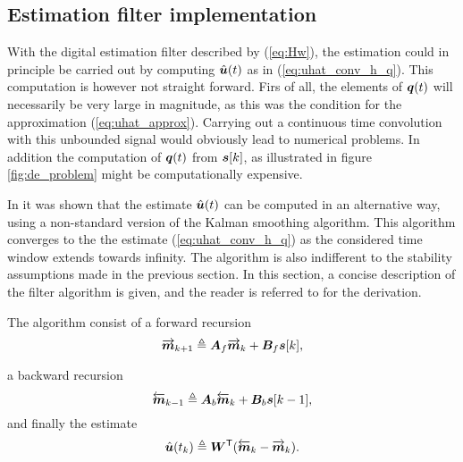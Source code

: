 \subsection{Estimation filter implementation}
With the digital estimation filter described by (\ref{eq:Hw}), the estimation could in principle be carried out by computing $\hat{\bm{u}}(t)$ as in (\ref{eq:uhat_conv_h_q}). This computation is however not straight forward. Firs of all, the elements of $\bm{q}(t)$ will necessarily be very large in magnitude, as this was the condition for the approximation (\ref{eq:uhat_approx}). Carrying out a continuous time convolution with this unbounded signal would obviously lead to numerical problems. In addition the computation of $\bm{q}(t)$ from $\bm{s}[k]$, as illustrated in figure \ref{fig:de_problem} might be computationally expensive.

In \cite{cbc_2011_loeliger} it was shown that the estimate $\hat{\bm{u}}(t)$ can be computed in an alternative way, using a non-standard version of the Kalman smoothing algorithm. This algorithm converges to the the estimate (\ref{eq:uhat_conv_h_q}) as the considered time window extends towards infinity. The algorithm is also indifferent to the stability assumptions made in the previous section. In this section, a concise description of the filter algorithm is given, and the reader is referred to \cite{cbc_2020_loeliger} for the derivation.

The algorithm consist of a forward recursion
\begin{equation}
    \label{eq:mf}
    \overrightarrow{\bm{m}}_{k+1} \triangleq \bm{A}_f \overrightarrow{\bm{m}}_k +  \bm{B}_f\bm{s}[k],
\end{equation}

a backward recursion
\begin{equation}
    \label{eq:mf}
    \overleftarrow{\bm{m}}_{k-1} \triangleq \bm{A}_b \overleftarrow{\bm{m}}_{k} +  \bm{B}_b\bm{s}[k-1],
\end{equation}
and finally the estimate
\begin{equation}
    \label{eq:uhat_filter_estimate}
    \hat{\bm{u}}(t_k) \triangleq \bm{W}^\mathsf{T}(\overleftarrow{\bm{m}}_k - \overrightarrow{\bm{m}}_k).
\end{equation}


